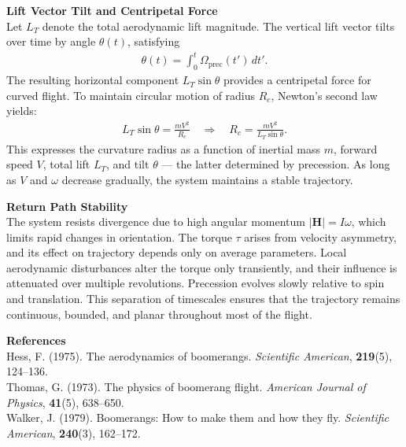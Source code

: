 \begin{technical}
\textbf{Lift Vector Tilt and Centripetal Force}\\[0.5em]
Let $L_T$ denote the total aerodynamic lift magnitude. The vertical lift vector tilts over time by angle $\theta(t)$, satisfying
\begin{align}
\theta(t) = \int_0^t \Omega_\text{prec}(t')\,dt'.
\end{align}
The resulting horizontal component $L_T \sin\theta$ provides a centripetal force for curved flight. To maintain circular motion of radius $R_c$, Newton’s second law yields:
\begin{align}
L_T \sin\theta = \frac{m V^2}{R_c} \quad \Rightarrow \quad R_c = \frac{m V^2}{L_T \sin\theta}.
\end{align}
This expresses the curvature radius as a function of inertial mass $m$, forward speed $V$, total lift $L_T$, and tilt $\theta$ — the latter determined by precession. As long as $V$ and $\omega$ decrease gradually, the system maintains a stable trajectory.

\textbf{Return Path Stability}\\[0.5em]
The system resists divergence due to high angular momentum $|\mathbf{H}| = I \omega$, which limits rapid changes in orientation. The torque $\tau$ arises from velocity asymmetry, and its effect on trajectory depends only on average parameters. Local aerodynamic disturbances alter the torque only transiently, and their influence is attenuated over multiple revolutions. Precession evolves slowly relative to spin and translation. This separation of timescales ensures that the trajectory remains continuous, bounded, and planar throughout most of the flight.

\textbf{References}\\
Hess, F. (1975). The aerodynamics of boomerangs. \textit{Scientific American}, \textbf{219}(5), 124–136.\\
Thomas, G. (1973). The physics of boomerang flight. \textit{American Journal of Physics}, \textbf{41}(5), 638–650.\\
Walker, J. (1979). Boomerangs: How to make them and how they fly. \textit{Scientific American}, \textbf{240}(3), 162–172.

\end{technical}
